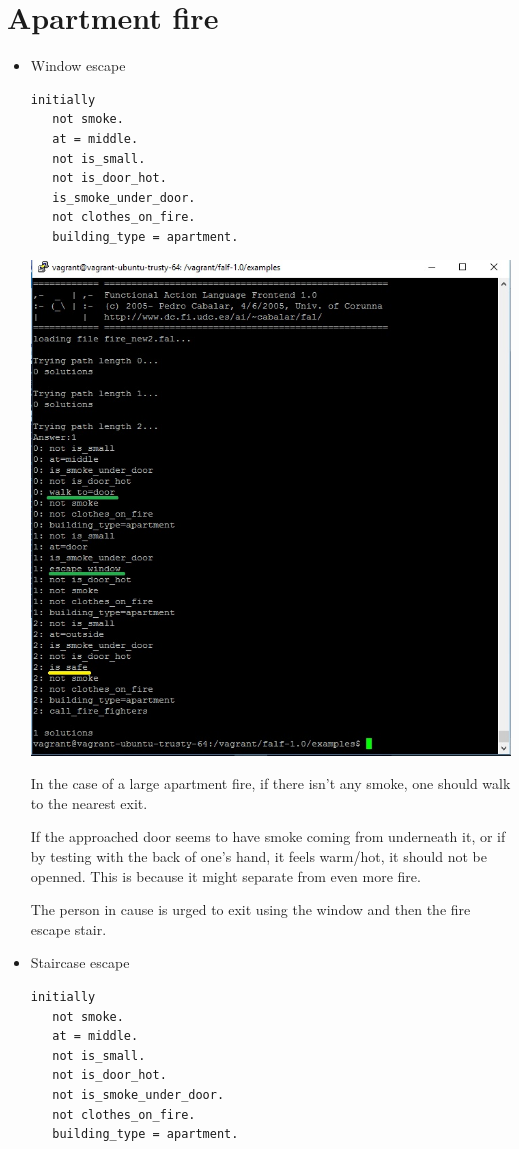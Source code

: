 \documentclass[a4paper,12pt]{report}
\begin{document}
\section{Apartment fire}
\begin{itemize}
\item Window escape
\begin{verbatim}
initially
   not smoke.
   at = middle.
   not is_small.
   not is_door_hot.
   is_smoke_under_door.
   not clothes_on_fire.
   building_type = apartment.
\end{verbatim}

\includegraphics[scale=0.8]{Screenshot_ap_fire1.jpg}

In the case of a large apartment fire, if there isn't any smoke, one should walk to the nearest exit.

If the approached door seems to have smoke coming from underneath it, or if by testing with the back of one's hand, it feels warm/hot, it should not be openned.
This is because it might separate from even more fire. 

The person in cause is urged to exit using the window and then the fire escape stair.

\item Staircase escape

\begin{verbatim}
initially
   not smoke.
   at = middle.
   not is_small.
   not is_door_hot.
   not is_smoke_under_door.
   not clothes_on_fire.
   building_type = apartment.
\end{verbatim}



\end{itemize}
\end{document}
